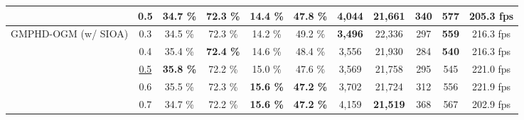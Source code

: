 \documentclass[journal]{IEEEtran}
\begin{document}
\begin{table*}[t]
\begin{tabular}{|c|c|ccccccccc|}
          & 0.5 & \footnotesize{34.7 \%} &  \footnotesize{72.3 \%} &  \footnotesize{14.4 \%} &  \footnotesize{47.8 \%} &  
           \footnotesize{4,044} &  \footnotesize{21,661} &  \footnotesize{340} &  \footnotesize{577} &  \footnotesize{205.3 fps}  \\ 
           \hline
             
            \multirow{5}{*}{GMPHD-OGM (w/ SIOA)} 
            
            & 0.3 & \footnotesize{34.5 \%} &  \footnotesize{72.3 \%} &  \footnotesize{14.2 \%} &  \footnotesize{49.2 \%} &  
           \footnotesize{\textbf{3,496}} &  \footnotesize{22,336} &  \footnotesize{297} &  \footnotesize{\textbf{559}} &  \footnotesize{216.3 fps}  \\ 
            
            & 0.4 & \footnotesize{35.4 \%} &  \footnotesize{\textbf{72.4 \%}} &  \footnotesize{14.6 \%} &  \footnotesize{48.4 \%} &  
           \footnotesize{3,556} &  \footnotesize{21,930} &  \footnotesize{284} &  \footnotesize{\textbf{540}} &  \footnotesize{216.3 fps}  \\ 

           & \underline{0.5} & \footnotesize{\textbf{35.8 \%}} &  \footnotesize{72.2 \%} &  \footnotesize{15.0 \%} &  \footnotesize{47.6 \%} &  
           \footnotesize{3,569} &  \footnotesize{21,758} &  \footnotesize{295} &  \footnotesize{545} &  \footnotesize{221.0 fps}  \\ 
           
           & 0.6 & \footnotesize{35.5 \%} &  \footnotesize{72.3 \%} &  \footnotesize{\textbf{15.6 \%}} &  \footnotesize{\textbf{47.2 \%}} &  
           \footnotesize{3,702} &  \footnotesize{21,724} &  \footnotesize{312} &  \footnotesize{556} &  \footnotesize{221.9 fps}  \\ 
           
           & 0.7 & \footnotesize{34.7 \%} &  \footnotesize{72.2 \%} &  \footnotesize{\textbf{15.6 \%}} &  \footnotesize{\textbf{47.2 \%}} &  
           \footnotesize{4,159} &  \footnotesize{\textbf{21,519}} &  \footnotesize{368} &  \footnotesize{567} &  \footnotesize{202.9 fps}  \\ 
           \hline
        \end{tabular}
\end{table*}
\end{document}
